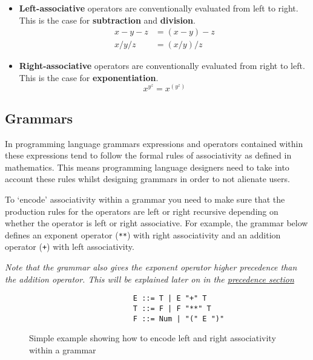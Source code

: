 \documentclass[12pt, letterpaper]{article}
\theoremstyle{definition}
\begin{document}
\begin{itemize}
    \item \textbf{Left-associative} operators are conventionally evaluated from left to right. This is the case for \textbf{subtraction} and \textbf{division}.
    \begin{equation}
        \begin{split}
            x - y - z &= (x - y) - z\\
            x / y / z &= (x / y) / z
        \end{split}
        \nonumber
    \end{equation}
    \item \textbf{Right-associative} operators are conventionally evaluated from right to left. This is the case for \textbf{exponentiation}.
    \begin{equation}
        x^{y^z} = x^{(y^z)}
        \nonumber
    \end{equation}
\end{itemize}

\subsection{Grammars}

In programming language grammars expressions and operators contained within these expressions tend to follow the formal rules of associativity as defined in mathematics. This means programming language designers need to take into account these rules whilst designing grammars in order to not alienate users.

To `encode' associativity within a grammar you need to make sure that the production rules for the operators are left or right recursive depending on whether the operator is left or right associative. For example, the grammar below defines an exponent operator (\verb|**|) with right associativity and an addition operator (\verb|+|) with left associativity.

\textit{Note that the grammar also gives the exponent operator higher precedence than the addition operator. This will be explained later on in the \hyperref[sec:precedence]{precedence section}}

\begin{figure}[H]
    \begin{center}
        \begin{verbatim}
                        E ::= T | E "+" T
                        T ::= F | F "**" T
                        F ::= Num | "(" E ")"
        \end{verbatim}
    \end{center}
    \vspace{-1.5em}
    \caption{\label{fig:4.2}Simple example showing how to encode left and right associativity within a grammar}
\end{figure}
\end{document}
